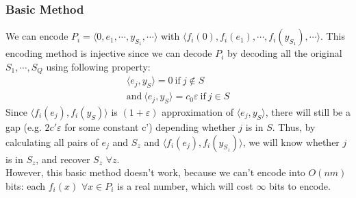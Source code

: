 \documentclass[11pt]{article}
\newcommand{\eps}{\varepsilon}
\begin{document}
\subsubsection{Basic Method}
We can encode $P_i = \langle 0, e_1, \cdots, y_{S_1}, \cdots \rangle$ with $\langle f_i(0), f_i(e_1), \cdots, f_i(y_{S_1}), \cdots \rangle$. This encoding method is injective since we can decode $P_i$ by decoding all the original $S_1, \cdots, S_{Q}$ using following property: 
\begin{align}
 \langle e_j, y_S\rangle = 0\ \text{if}\ j \not\in S \\
 \text{and}\  \langle e_j, y_S \rangle  = c_0 \eps\ \text{if}\ j \in S 
\end{align}
Since $\langle f_i(e_j), f_i(y_S) \rangle$ is $(1+\eps)$ approximation of $\langle e_j, y_S \rangle$, there will still be a gap (e.g. $2c' \eps$ for some constant c') depending whether $j$ is in $S$. Thus, by calculating all pairs of $e_j$ and $S_z$ and $\langle f_i(e_j), f_i(y_{S_z}) \rangle$, we will know whether $j$ is in $S_z$, and recover $S_z$ $\forall z$. \\
However, this basic method doesn't work, because we can't encode into $O(nm)$ bits: each $f_i(x)$ $\forall x \in P_i$ is a real number, which will cost $\infty$ bits to encode. 
\end{document}
